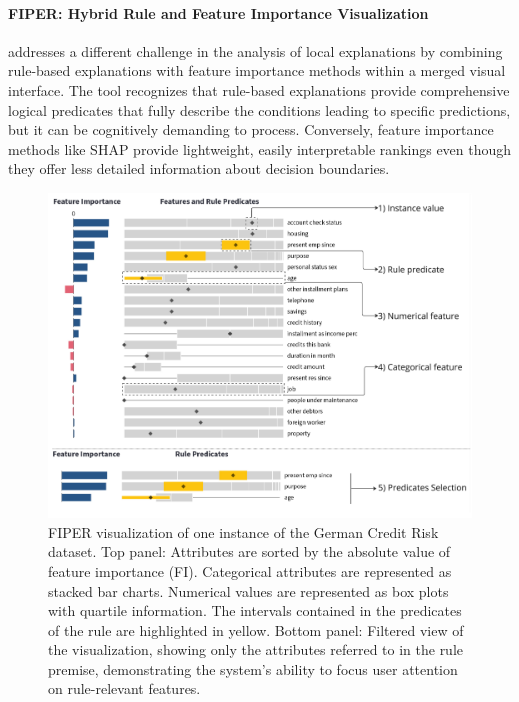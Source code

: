 \paragraph{FIPER: Hybrid Rule and Feature Importance Visualization}

\cite{cappuccio2024fipervisualbasedexplanationcombining} addresses a different challenge in the analysis of local explanations by combining rule-based explanations with feature importance methods within a merged visual interface. The tool recognizes that rule-based explanations provide comprehensive logical predicates that fully describe the conditions leading to specific predictions, but it can be cognitively demanding to process. Conversely, feature importance methods like SHAP \cite{lundberg2017unified} provide lightweight, easily interpretable rankings even though they offer less detailed information about decision boundaries.

\begin{figure}[ht!]
\centering
\includegraphics[width=\textwidth]{images/FIPER 1.png}
\caption{FIPER visualization of one instance of the German Credit Risk dataset. Top panel: Attributes are sorted by the absolute value of feature importance (FI). Categorical attributes are represented as stacked bar charts. Numerical values are represented as box plots with quartile information. The intervals contained in the predicates of the rule are highlighted in yellow. Bottom panel: Filtered view of the visualization, showing only the attributes referred to in the rule premise, demonstrating the system's ability to focus user attention on rule-relevant features.}
\label{fig:fiper_interface}
\end{figure}

